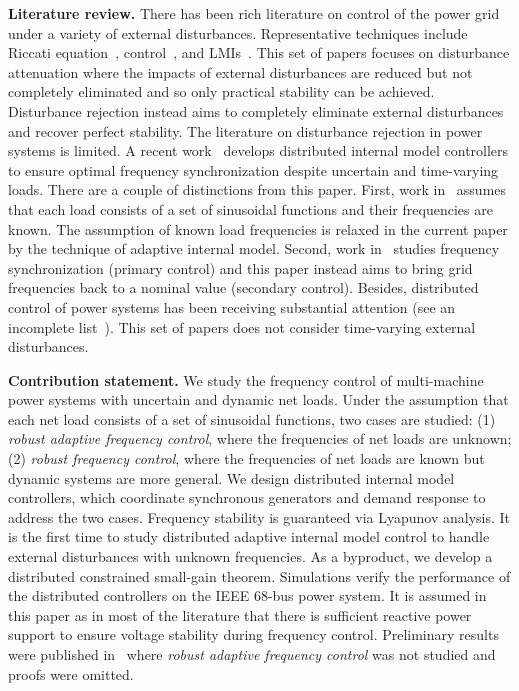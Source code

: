 \documentclass[journal]{IEEEtran}
\begin{document}
\textbf{Literature review.} There has been rich literature on control of the power grid under a variety of external disturbances.
Representative techniques include Riccati equation~\cite{lim1996robust,ray1999new},  control~\cite{bevrani2005bilateral,shayeghi2008robust}, and LMIs~\cite{marinovici2013distributed,siljak2002robust}.
This set of papers focuses on disturbance attenuation where the impacts of external disturbances are reduced but not completely eliminated and so only practical stability can be achieved. Disturbance rejection instead aims to completely eliminate external disturbances and recover perfect stability. The literature on disturbance rejection in power systems is limited. A recent work~\cite{trip2016internal} develops distributed internal model controllers to ensure optimal frequency synchronization despite uncertain and time-varying loads. There are a couple of distinctions from this paper. First, work in~\cite{trip2016internal} assumes that each load consists of a set of sinusoidal functions and their frequencies are known. The assumption of known load frequencies is relaxed in the current paper by the technique of adaptive internal model. Second, work in~\cite{trip2016internal} studies frequency synchronization (primary control) and this paper instead aims to bring grid frequencies back to a nominal value (secondary control).
Besides, distributed control of power systems has been receiving substantial attention (see an incomplete list~\cite{simpson2013synchronization,xin2011self,zhang2015real,zhao2014design}). This set of papers does not consider time-varying external disturbances.

\textbf{Contribution statement.} We study the frequency control of multi-machine power systems with uncertain and dynamic net loads.
Under the assumption that each net load consists of a set of sinusoidal functions, two cases are studied:
(1) \emph{robust adaptive frequency control}, where the frequencies of net loads are unknown; (2) \emph{robust frequency control}, where the frequencies of net loads are known but dynamic systems are more general.
We design distributed internal model controllers, which coordinate synchronous generators and demand response to address the two cases. Frequency stability is guaranteed via Lyapunov analysis. It is the first time to study distributed adaptive internal model control to handle external disturbances with unknown frequencies. As a byproduct, we develop a distributed constrained small-gain theorem. Simulations verify the performance of the distributed controllers on the IEEE 68-bus power system.
It is assumed in this paper as in most of the literature that there is sufficient reactive power support to ensure voltage stability during frequency control.
Preliminary results were published in~\cite{HK-MZ:ACC15} where \emph{robust adaptive frequency control} was not studied and proofs were omitted.
\end{document}
